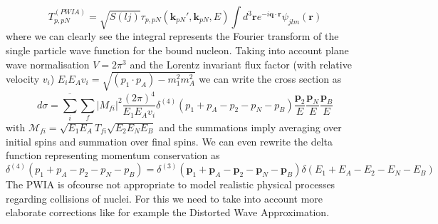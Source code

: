 \documentclass[11pt]{article}
\numberwithin{equation}{section}
\begin{document}
\begin{equation}
	T_{p,pN}^{(PWIA)} = \sqrt{S(lj)}\tau_{p,pN}(\mathbf{k}_{pN}',\mathbf{k}_{pN}, E) \int d^3\mathbf{r}e^{-i\mathbf{q}\cdot \mathbf{r}}\psi_{jlm}(\mathbf{r})
\end{equation}
where we can clearly see the integral represents the Fourier transform of the single particle wave function for the bound nucleon. Taking into account plane wave normalisation $V=2\pi^3$ and the Lorentz invariant flux factor (with relative velocity $v_i$) $E_i E_A v_i = \sqrt{(p_1 \cdot p_A)- m_1^2 m_A^2}$ we can write the cross section as
\begin{equation}
	d\sigma = \overline{\underset{i}\sum} \underset{f} \sum |M_{fi}|^2 \frac{(2\pi)^4}{E_1E_Av_i} \delta^{(4)}(p_1 + p_A -p_2 -p_N - p_B) \frac{\mathbf{p}_2}{E}\frac{\mathbf{p}_N}{E}\frac{\mathbf{p}_B}{E}
\end{equation}
with $\mathcal{M}_{fi} = \sqrt{E_1 E_A} T_{fi} \sqrt{E_2 E_N E_B}$ and the summations imply averaging over initial spins and summation over final spins. We can even rewrite the delta function representing momentum conservation as
\small
\begin{equation}
	\delta^{(4)}(p_1 + p_A -p_2 -p_N - p_B) = \delta^{(3)}(\mathbf{p}_1 + \mathbf{p}_A - \mathbf{p}_2 - \mathbf{p}_N - \mathbf{p}_B)\delta(E_1 + E_A - E_2 - E_N - E_B)
\end{equation}
\normalsize
The PWIA is ofcourse not appropriate to model realistic physical processes regarding collisions of nuclei. For this we need to take into account more elaborate corrections like for example the Distorted Wave Approximation.
\end{document}
